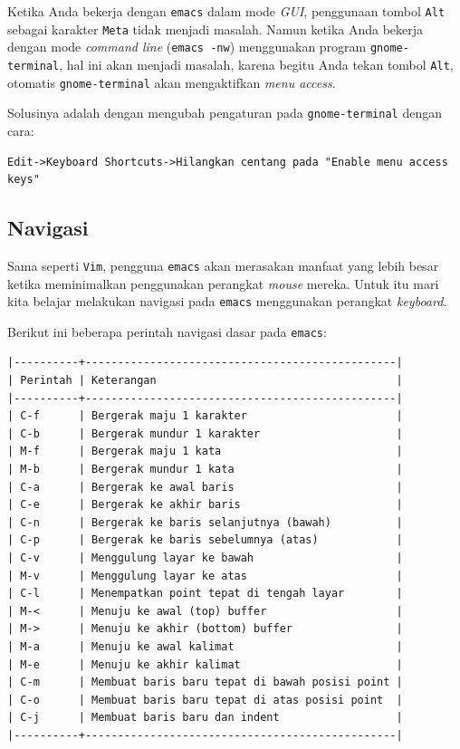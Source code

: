 \documentclass{article}
\begin{document}
Ketika Anda bekerja dengan \verb=emacs= dalam mode \emph{GUI},
penggunaan tombol \verb=Alt= sebagai karakter \verb=Meta= 
tidak menjadi masalah. Namun ketika Anda bekerja dengan mode
\emph{command line} (\verb=emacs -nw=) menggunakan program 
\verb=gnome-terminal=, hal ini akan menjadi masalah, karena 
begitu Anda tekan tombol \verb=Alt=, 
otomatis \verb=gnome-terminal= akan mengaktifkan \emph{menu access}.

Solusinya adalah dengan mengubah pengaturan pada 
\verb=gnome-terminal= dengan cara:

\begin{verbatim}
Edit->Keyboard Shortcuts->Hilangkan centang pada "Enable menu access keys"
\end{verbatim}

\subsection{Navigasi}

Sama seperti \verb=Vim=, pengguna \verb=emacs= akan
merasakan manfaat yang lebih besar ketika meminimalkan
penggunakan perangkat \emph{mouse} mereka. Untuk itu mari kita
belajar melakukan navigasi pada \verb=emacs= menggunakan
perangkat \emph{keyboard}.

Berikut ini beberapa perintah navigasi dasar pada \verb=emacs=:

\begin{verbatim}
|----------+------------------------------------------------|
| Perintah | Keterangan                                     |
|----------+------------------------------------------------|
| C-f      | Bergerak maju 1 karakter                       |
| C-b      | Bergerak mundur 1 karakter                     |
| M-f      | Bergerak maju 1 kata                           |
| M-b      | Bergerak mundur 1 kata                         |
| C-a      | Bergerak ke awal baris                         |
| C-e      | Bergerak ke akhir baris                        |
| C-n      | Bergerak ke baris selanjutnya (bawah)          |
| C-p      | Bergerak ke baris sebelumnya (atas)            |
| C-v      | Menggulung layar ke bawah                      |
| M-v      | Menggulung layar ke atas                       |
| C-l      | Menempatkan point tepat di tengah layar        |
| M-<      | Menuju ke awal (top) buffer                    |
| M->      | Menuju ke akhir (bottom) buffer                |
| M-a      | Menuju ke awal kalimat                         |
| M-e      | Menuju ke akhir kalimat                        |
| C-m      | Membuat baris baru tepat di bawah posisi point |
| C-o      | Membuat baris baru tepat di atas posisi point  |
| C-j      | Membuat baris baru dan indent                  |
|----------+------------------------------------------------|
\end{verbatim}
\end{document}
